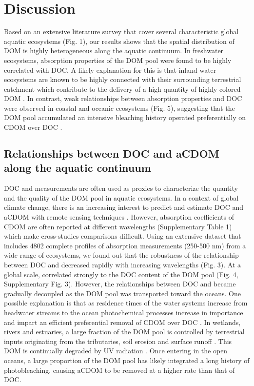 
\section*{Discussion}
\label{sec:Discussion}

Based on an extensive literature survey that cover several characteristic global aquatic ecosystems (Fig. 1), our results shows that the spatial distribution of DOM is highly heterogeneous along the aquatic continuum. In freshwater ecosystems, absorption properties of the DOM pool were found to be highly correlated with DOC. A likely explanation for this is that inland water ecosystems are known to be highly connected with their surrounding terrestrial catchment \citep{Wiens2002, Frenette2012} which contribute to the delivery of a high quantity of highly colored DOM \citep{Massicotte2011EA, Lambert2016, Cole2007}. In contrast, weak relationships between absorption properties and DOC were observed in coastal and oceanic ecosystems (Fig. 5), suggesting that the DOM pool accumulated an intensive bleaching history operated preferentially on CDOM over DOC \citep{Vahatalo2004}.

\subsection*{Relationships between DOC and aCDOM along the aquatic continuum}

DOC and \acdom measurements are often used as proxies to characterize the quantity and the quality of the DOM pool in aquatic ecosystems. In a context of global climate change, there is an increasing interest to predict and estimate DOC and aCDOM with remote sensing techniques \citep{Kutser2005, Olmanson2016, Slonecker2016}. However, absorption coefficients of CDOM are often reported at different wavelengths (Supplementary Table 1) which make cross-studies comparisons difficult. Using an extensive dataset that includes 4802 complete profiles of absorption measurements (250-500 nm) from a wide range of ecosystems, we found out that the robustness of the relationship between DOC and \acdom{\lambda} decreased rapidly with increasing wavelengths (Fig. 3). At a global scale,  correlated strongly to the DOC content of the DOM pool (Fig. 4, Supplementary Fig. 3). However, the relationships between DOC and  became gradually decoupled as the DOM pool was transported toward the oceans. One possible explanation is that as residence times of the water systems increase from headwater streams to the ocean photochemical processes increase in importance and impart an  efficient preferential removal of  CDOM over DOC \citep{Vahatalo2004, Moran2000, Bittar2015, Hansen2016}. In wetlands, rivers and estuaries, a large fraction of the DOM pool is controlled by terrestrial inputs originating from the tributaries, soil erosion and surface runoff \citep{Massicotte2011EA, Lambert2015a}. This DOM is continually degraded by UV radiation \citep{Moran1997}. Once entering in the open oceans, a large proportion of the DOM pool has likely integrated a long history of photobleaching, causing aCDOM to be removed at a higher rate than that of DOC.

